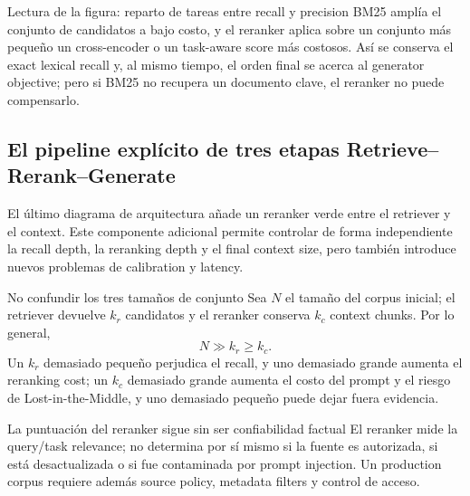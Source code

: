 
\begin{knowledgebox}{Lectura de la figura: reparto de tareas entre recall y precision}
BM25 amplía el conjunto de candidatos a bajo costo, y el reranker aplica sobre un conjunto más pequeño un cross-encoder o un task-aware score más costosos. Así se conserva el exact lexical recall y, al mismo tiempo, el orden final se acerca al generator objective; pero si BM25 no recupera un documento clave, el reranker no puede compensarlo.
\end{knowledgebox}

\subsection{El pipeline explícito de tres etapas Retrieve--Rerank--Generate}

El último diagrama de arquitectura añade un reranker verde entre el retriever y el context. Este componente adicional permite controlar de forma independiente la recall depth, la reranking depth y el final context size, pero también introduce nuevos problemas de calibration y latency.


\begin{importantbox}{No confundir los tres tamaños de conjunto}
Sea $N$ el tamaño del corpus inicial; el retriever devuelve $k_r$ candidatos y el reranker conserva $k_c$ context chunks. Por lo general,
\[
N\gg k_r\ge k_c.
\]
Un $k_r$ demasiado pequeño perjudica el recall, y uno demasiado grande aumenta el reranking cost; un $k_c$ demasiado grande aumenta el costo del prompt y el riesgo de Lost-in-the-Middle, y uno demasiado pequeño puede dejar fuera evidencia.
\end{importantbox}

\begin{warningbox}{La puntuación del reranker sigue sin ser confiabilidad factual}
El reranker mide la query/task relevance; no determina por sí mismo si la fuente es autorizada, si está desactualizada o si fue contaminada por prompt injection. Un production corpus requiere además source policy, metadata filters y control de acceso.
\end{warningbox}

